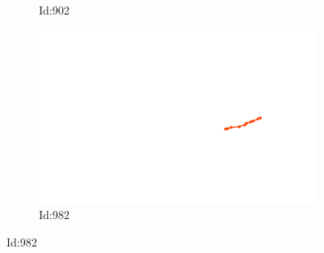 \documentclass[12pt,twoside]{report}
\begin{document}
\begin{figure}
\begin{subfigure}[b]{0.20\textwidth}
\caption{Id:902}
\end{subfigure}
\begin{subfigure}[b]{0.20\textwidth}
\centering
\includegraphics[width=\textwidth]{../trajectories/982.png}
\caption{Id:982}
\end{subfigure}
\end{figure}
\end{document}
